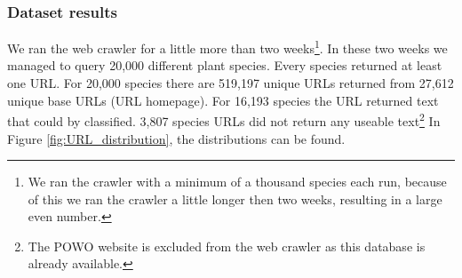 \documentclass[a4paper, 12pt, oneside]{book} %
\begin{document}
\subsubsection{Dataset results}
We ran the web crawler for a little more than two weeks\footnote{We ran the crawler with a minimum of a thousand species each run, because of this we ran the crawler a little longer then two weeks, resulting in a large even number.}.
In these two weeks we managed to query 20,000 different plant species.
Every species returned at least one URL.
For 20,000 species there are 519,197 unique URLs returned from 27,612 unique base URLs (URL homepage).
For 16,193 species the URL returned text that could by classified.
3,807 species URLs did not return any useable text\footnote{The POWO website is excluded from the web crawler as this database is already available.}
In Figure \ref{fig:URL_distribution}, the distributions can be found.

\end{document}
